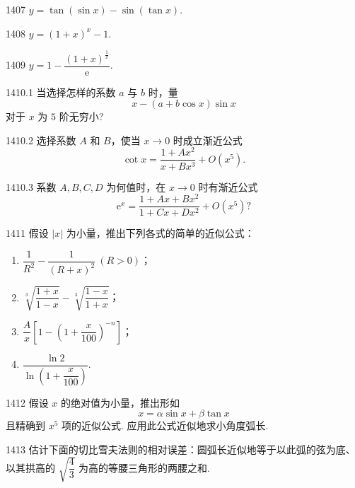
\begin{prob}[S]{1407}
$y = \tan(\sin x) - \sin(\tan x)$.
\end{prob}

\begin{prob}[S]{1408}
$y = (1 + x)^x - 1$.
\end{prob}

\begin{prob}[S]{1409}
$y = 1 - \dfrac{(1 + x)^{\frac{1}{x}}}{\mathrm{e}}$.
\end{prob}

\begin{prob}[M]{1410.1}
当选择怎样的系数 $a$ 与 $b$ 时，量
\[
x - (a + b\cos x)\sin x
\]
对于 $x$ 为 $5$ 阶无穷小?
\end{prob}

\begin{prob}[M]{1410.2}
选择系数 $A$ 和 $B$，使当 $x \to 0$ 时成立渐近公式
\[
\cot x = \frac{1 + Ax^2}{x + Bx^3} + O(x^5).
\]
\end{prob}

\begin{prob}[M]{1410.3}
系数 $A, B, C, D$ 为何值时，在 $x \to 0$ 时有渐近公式
\[
\mathrm{e}^x = \frac{1 + Ax + Bx^2}{1 + Cx + Dx^2} + O(x^5)\text{?}
\]
\end{prob}

\begin{prob}[L]{1411}
假设 $|x|$ 为小量，推出下列各式的简单的近似公式：
\begin{enumerate}[label=(\alph*), itemsep=2pt, topsep=3pt]
    \item $\dfrac{1}{R^2} - \dfrac{1}{(R + x)^2} \ (R > 0)$；
    \item $\sqrt[3]{\dfrac{1 + x}{1 - x}} - \sqrt[3]{\dfrac{1 - x}{1 + x}}$；
    \item $\dfrac{A}{x}\left[1 - \left(1 + \dfrac{x}{100}\right)^{-n}\right]$；
    \item $\dfrac{\ln 2}{\ln\left(1 + \dfrac{x}{100}\right)}$.
\end{enumerate}
\end{prob}

\begin{prob}[M]{1412}
假设 $x$ 的绝对值为小量，推出形如
\[
x = \alpha \sin x + \beta \tan x
\]
且精确到 $x^5$ 项的近似公式. 应用此公式近似地求小角度弧长.
\end{prob}

\begin{prob}[M]{1413}
估计下面的切比雪夫法则的相对误差：圆弧长近似地等于以此弧的弦为底、以其拱高的 $\sqrt{\dfrac{4}{3}}$ 为高的等腰三角形的两腰之和.
\end{prob}

